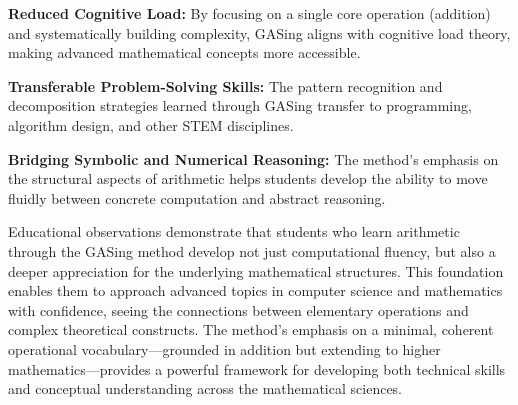 \noindent\textbf{\textbf{Reduced Cognitive Load}:} By focusing on a single core operation (addition) and systematically building complexity, GASing aligns with cognitive load theory, making advanced mathematical concepts more accessible.



\noindent\textbf{\textbf{Transferable Problem-Solving Skills}:} The pattern recognition and decomposition strategies learned through GASing transfer to programming, algorithm design, and other STEM disciplines.



\noindent\textbf{\textbf{Bridging Symbolic and Numerical Reasoning}:} The method's emphasis on the structural aspects of arithmetic helps students develop the ability to move fluidly between concrete computation and abstract reasoning.


Educational observations demonstrate that students who learn arithmetic through the GASing method develop not just computational fluency, but also a deeper appreciation for the underlying mathematical structures. This foundation enables them to approach advanced topics in computer science and mathematics with confidence, seeing the connections between elementary operations and complex theoretical constructs. The method's emphasis on a minimal, coherent operational vocabulary—grounded in addition but extending to higher mathematics—provides a powerful framework for developing both technical skills and conceptual understanding across the mathematical sciences.
